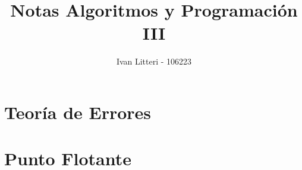 \documentclass[hidelinks]{article}
\title{Notas Algoritmos y Programación III}
\author{Ivan Litteri - 106223}
\date{}
\begin{document}
\maketitle
\lstset{language=C}
\lstset{language=Python}
\tableofcontents
\clearpage

\section{Teoría de Errores}

\clearpage

\section{Punto Flotante}

\clearpage

\printindex
\end{document}
